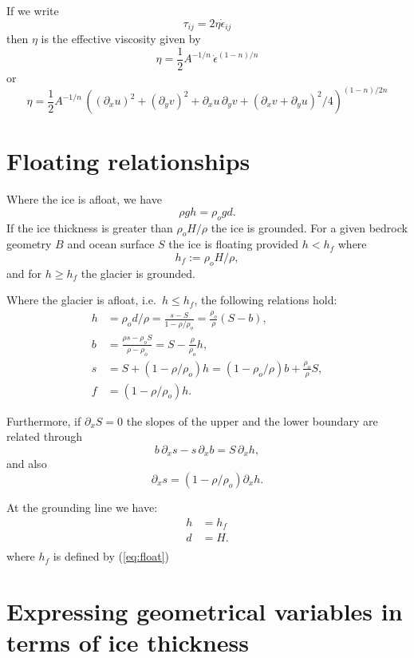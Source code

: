 \documentclass[10pt,a4paper]{book}
\newcommand{\p}{\partial}
\newcommand{\eij}{\dot{\epsilon}_{ij}}
\begin{document}
If we write
\[
\tau_{ij}= 2 \eta \eij
\]
then $\eta$ is the effective viscosity given by
\[
\eta=\frac{1}{2} A^{-1/n} \,\dot{\epsilon}^{(1-n)/n} 
\]
or
\begin{equation}
\eta= \frac{1}{2} A^{-1/n} \, ((\p_{x} u)^2 + (\p_{y} v)^2 + \p_{x} u \,\p_{y} v + (\p_{x} v + \p_{y} u)^2/4)^{(1-n)/2n}
  \label{eq:etaint3}
\end{equation}

\section{Floating relationships}
Where the ice is afloat, we have
\[  \rho g h = \rho_o g d .\]
If the ice thickness is greater than $\rho_o H/\rho$ the ice is grounded. For a given bedrock geometry $B$ and ocean
surface $S$ the ice is floating provided $h<h_f$ where
\begin{equation}
h_f := \rho_o H /\rho, 
\label{eq:float}
\end{equation}
and for $h \ge h_f$ the glacier is grounded.


Where the glacier is afloat, i.e.\ $h \le h_f$, the following relations hold:
\begin{align} 
h &= \rho_o d /\rho =\frac{s-S}{1-\rho/\rho_o} = \frac{\rho_o}{\rho} (S-b), \label{eq:hs1} \\
b &= \frac{\rho s - \rho_o S}{\rho-\rho_o}  = S-\frac{\rho}{\rho_o} h , \label{eq:bh1}\\
s &= S+(1-\rho/\rho_o) h = (1-\rho_o/\rho) b +\frac{\rho_o}{\rho} S, \label{eq:sb2}\\
f &= (1-\rho/\rho_o) h  . 
\end{align}

Furthermore, if $\p_x S=0$ the slopes of the upper and the lower boundary are related through
\begin{equation}
b \, \p_x s -  s \, \p_x b = S \, \p_x h,
\label{eq:resi}
\end{equation}
and also
\[ \p_x s=(1-\rho/\rho_o) \p_x h .\]

At the grounding line we have:
\begin{align*}
h&=h_f\\
d&=H.\\
\end{align*}
where $h_f$ is defined by (\ref{eq:float})
\section{Expressing geometrical variables in terms of ice thickness}
\end{document}
